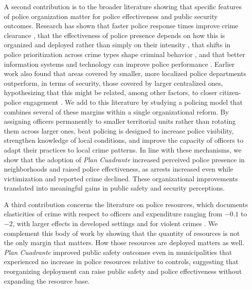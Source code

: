 A second contribution is to the broader literature showing that specific features of police organization matter for police effectiveness and public security outcomes. Research has shown that faster police response times improve crime clearance \citep{Blanes_Kirchmaier}, that the effectiveness of police presence depends on how this is organized and deployed rather than simply on their intensity \citep{facchetti2025, MASTROBUONI2019, Blanes_Mastrobuoni_2018}, that shifts in police prioritization across crime types shape criminal behavior \citep{Adda_etal_2014}, and that better information systems and technology can improve police performance \citep{Mastrobuoni_2020}. Earlier work also found that areas covered by smaller, more localized police departments outperform, in terms of security, those covered by larger centralized ones, hypothesizing that this might be related, among other factors, to closer citizen-police engagement \citep{ostrom1973, ostrom1978}. We add to this literature by studying a policing model that combines several of these margins within a single organizational reform. By assigning officers permanently to smaller territorial units rather than rotating them across larger ones, beat policing is designed to increase police visibility, strengthen knowledge of local conditions, and improve the capacity of officers to adapt their practices to local crime patterns. In line with these mechanisms, we show that the adoption of \emph{Plan Cuadrante} increased perceived police presence in neighborhoods and raised police effectiveness, as arrests increased even while victimization and reported crime declined. These organizational improvements translated into meaningful gains in public safety and security perceptions.

A third contribution concerns the literature on police resources, which documents elasticities of crime with respect to officers and expenditure ranging from $-0.1$ to $-2$, with larger effects in developed settings and for violent crimes \citep{Chalfin_JEL, Levitt_1997, DiTella}. We complement this body of work by showing that the quantity of resources is not the only margin that matters. How those resources are deployed matters as well. \emph{Plan Cuadrante} improved public safety outcomes even in municipalities that experienced no increase in police resources relative to controls, suggesting that reorganizing deployment can raise public safety and police effectiveness without expanding the resource base.


